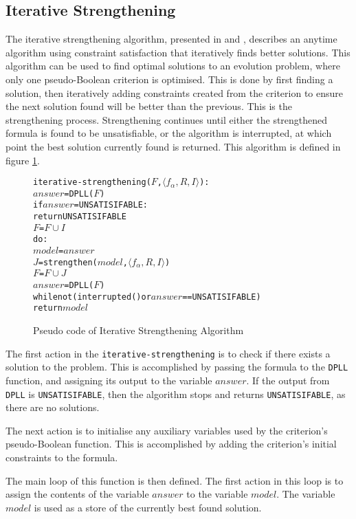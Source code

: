 \subsection{Iterative Strengthening}
The iterative strengthening algorithm, presented in \citep{calistri1994iterative} and \citep{le2010sat4j}, 
describes an anytime algorithm using constraint satisfaction that iteratively finds better solutions.
This algorithm can be used to find optimal solutions to an evolution problem, where only one pseudo-Boolean criterion is optimised.
This is done by first finding a solution, then iteratively adding constraints created from the criterion to ensure the next solution found will be better than the previous.
This is the strengthening process.
Strengthening continues until either the strengthened formula is found to be unsatisfiable, or the algorithm is interrupted, at which point the best solution currently found is returned. 
This algorithm is defined in figure \ref{impl.strength}.

\begin{figure}[htp]
\begin{center}
\begin{alltt}
iterative-strengthening(\(F\),\(\langle f_{\alpha}, R, I \rangle\)):
    \(answer\) = DPLL(\(F\))
    if \(answer\) = UNSATISIFABLE:
        return UNSATISIFABLE
    \(F\) = \(F \cup I\)
    do:
        \(model\) = \(answer\)
        \(J\) = strengthen(\(model\),\(\langle f_{\alpha}, R, I \rangle\))
        \(F\) = \(F \cup J\)
        \(answer\) = DPLL(\(F\))
    while not (interrupted() or  \(answer\) == UNSATISIFABLE)
    return \(model\) 
\end{alltt}
  \caption{Pseudo code of Iterative Strengthening Algorithm}
  \label{impl.strength}
\end{center}
\end{figure}

The first action in the \texttt{iterative-strengthening} is to check if there exists a solution to the problem.
This is accomplished by passing the formula to the \verb+DPLL+ function, and assigning its output to the variable $answer$.
If the output from \texttt{DPLL} is \texttt{UNSATISIFABLE}, then the algorithm stops and returns \texttt{UNSATISIFABLE}, as there are no solutions.

The next action is to initialise any auxiliary variables used by the criterion's pseudo-Boolean function.
This is accomplished by adding the criterion's initial constraints to the formula.

The main loop of this function is then defined.
The first action in this loop is to assign the contents of the variable $answer$ to the variable $model$.
The variable $model$ is used as a store of the currently best found solution.

